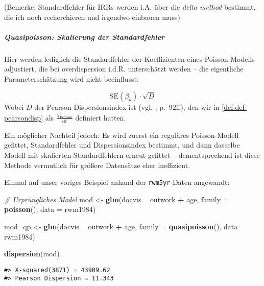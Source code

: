 \documentclass[ngerman,a4paper,]{scrartcl}
\newenvironment{Shaded}{\begin{snugshade}}{\end{snugshade}}
\newcommand{\CommentTok}[1]{\textcolor[rgb]{0.56,0.35,0.01}{\textit{#1}}}
\newcommand{\DataTypeTok}[1]{\textcolor[rgb]{0.13,0.29,0.53}{#1}}
\newcommand{\KeywordTok}[1]{\textcolor[rgb]{0.13,0.29,0.53}{\textbf{#1}}}
\newcommand{\NormalTok}[1]{#1}
\newcommand{\OperatorTok}[1]{\textcolor[rgb]{0.81,0.36,0.00}{\textbf{#1}}}
\newcommand{\StringTok}[1]{\textcolor[rgb]{0.31,0.60,0.02}{#1}}
\let\oldsubparagraph\subparagraph
\renewcommand{\subparagraph}[1]{\oldsubparagraph{#1}\mbox{}}
\theoremstyle{definition}
\theoremstyle{definition}
\theoremstyle{definition}
\theoremstyle{remark}
\begin{document}
(Bemerke: Standardfehler für IRRs werden i.A. über die \emph{delta method} bestimmt, die ich noch recherchieren und irgendwo einbauen muss)

\hypertarget{quasipoisson-skalierung-der-standardfehler}{%
\subparagraph{Quasipoisson: Skalierung der Standardfehler}\label{quasipoisson-skalierung-der-standardfehler}}

Hier werden lediglich die Standardfehler der Koeffizienten eines Poisson-Modells adjustiert, die bei overdispersion i.d.R. unterschätzt werden -- die eigentliche Parameterschätzung wird nicht beeinflusst:

\[\mathrm{SE}(\beta_k) \cdot \sqrt{D}\]
Wobei \(D\) der Pearson-Dispersionsindex ist (vgl. \citet{hilbeModelingCountData2014}, p.~92ff), den wir in \ref{def:def-pearsondisp} als \(\frac{\chi^2_{\mathrm{Pearson}}}{\mathrm{df}}\) definiert hatten.

Ein möglicher Nachteil jedoch: Es wird zuerst ein reguläres Poisson-Modell gefittet, Standardfehler und Dispersionsindex bestimmt, und dann dasselbe Modell mit skalierten Standardfehlern erneut gefittet -- dementsprechend ist diese Methode vermutlich für größere Datensätze eher ineffizient.

Einmal auf unser voriges Beispiel anhand der \texttt{rwm5yr}-Daten angewandt:

\begin{Shaded}
\begin{Highlighting}[]
\CommentTok{# Urprüngliches Model}
\NormalTok{mod <-}\StringTok{ }\KeywordTok{glm}\NormalTok{(docvis }\OperatorTok{~}\StringTok{ }\NormalTok{outwork }\OperatorTok{+}\StringTok{ }\NormalTok{age, }\DataTypeTok{family =} \KeywordTok{poisson}\NormalTok{(), }\DataTypeTok{data =}\NormalTok{ rwm1984)}

\NormalTok{mod_qp <-}\StringTok{ }\KeywordTok{glm}\NormalTok{(docvis }\OperatorTok{~}\StringTok{ }\NormalTok{outwork }\OperatorTok{+}\StringTok{ }\NormalTok{age, }\DataTypeTok{family =} \KeywordTok{quasipoisson}\NormalTok{(), }\DataTypeTok{data =}\NormalTok{ rwm1984)}

\KeywordTok{dispersion}\NormalTok{(mod)}
\end{Highlighting}
\end{Shaded}

\begin{verbatim}
#> X-squared(3871) = 43909.62
#> Pearson Dispersion = 11.343
\end{verbatim}
\end{document}
